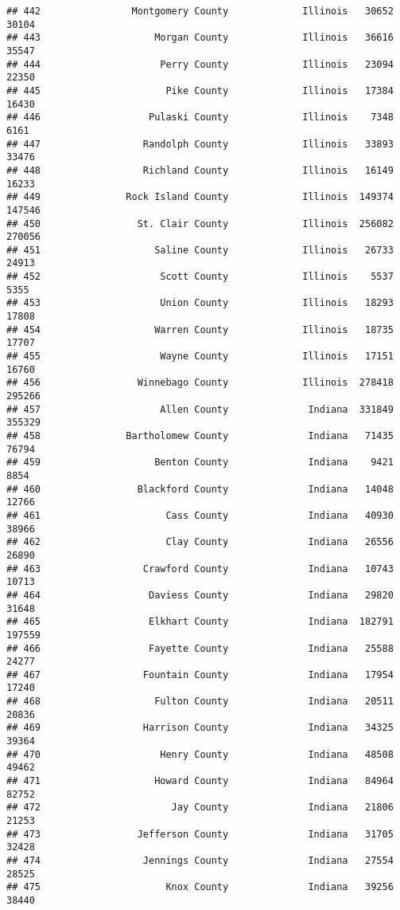 \documentclass[
]{article}
\begin{document}
\begin{verbatim}
## 442                Montgomery County             Illinois   30652   30104
## 443                    Morgan County             Illinois   36616   35547
## 444                     Perry County             Illinois   23094   22350
## 445                      Pike County             Illinois   17384   16430
## 446                   Pulaski County             Illinois    7348    6161
## 447                  Randolph County             Illinois   33893   33476
## 448                  Richland County             Illinois   16149   16233
## 449               Rock Island County             Illinois  149374  147546
## 450                 St. Clair County             Illinois  256082  270056
## 451                    Saline County             Illinois   26733   24913
## 452                     Scott County             Illinois    5537    5355
## 453                     Union County             Illinois   18293   17808
## 454                    Warren County             Illinois   18735   17707
## 455                     Wayne County             Illinois   17151   16760
## 456                 Winnebago County             Illinois  278418  295266
## 457                     Allen County              Indiana  331849  355329
## 458               Bartholomew County              Indiana   71435   76794
## 459                    Benton County              Indiana    9421    8854
## 460                 Blackford County              Indiana   14048   12766
## 461                      Cass County              Indiana   40930   38966
## 462                      Clay County              Indiana   26556   26890
## 463                  Crawford County              Indiana   10743   10713
## 464                   Daviess County              Indiana   29820   31648
## 465                   Elkhart County              Indiana  182791  197559
## 466                   Fayette County              Indiana   25588   24277
## 467                  Fountain County              Indiana   17954   17240
## 468                    Fulton County              Indiana   20511   20836
## 469                  Harrison County              Indiana   34325   39364
## 470                     Henry County              Indiana   48508   49462
## 471                    Howard County              Indiana   84964   82752
## 472                       Jay County              Indiana   21806   21253
## 473                 Jefferson County              Indiana   31705   32428
## 474                  Jennings County              Indiana   27554   28525
## 475                      Knox County              Indiana   39256   38440

\end{verbatim}
\end{document}
